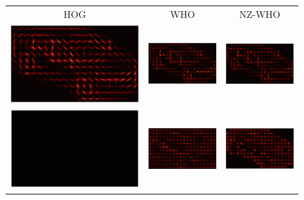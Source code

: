 \documentclass[10pt,twocolumn,letterpaper]{article}
\begin{document}
\begin{figure}[t]
  \begin{center}
    \setlength\tabcolsep{3pt}
    \begin{tabular}{ccc}
      HOG & WHO & NZ-WHO \\
    \includegraphics[width=0.28\linewidth]{hog_crop} &
    \includegraphics[width=0.28\linewidth]{whiten_all_crop} &
    \includegraphics[width=0.28\linewidth]{whiten_non_zero_crop} \\
     \includegraphics[width=0.28\linewidth]{hog_neg_crop} &
     \includegraphics[width=0.28\linewidth]{whiten_all_neg_crop}  &
     \includegraphics[width=0.28\linewidth]{whiten_non_zero_neg} \\

\end{tabular}
\end{center}
\end{figure}
\end{document}
